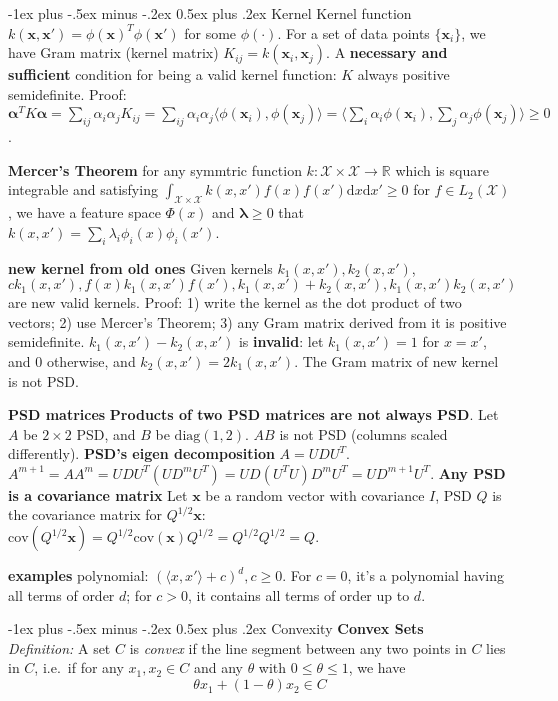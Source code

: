 \documentclass[10pt,landscape]{article}
\makeatletter
\newcommand{\vect}[1]{\boldsymbol{#1}}
\renewcommand{\section}{\@startsection{section}{1}{0mm}%
                                {-1ex plus -.5ex minus -.2ex}%
                                {0.5ex plus .2ex}%
                                {\normalfont\large\bfseries}}
\makeatother
\begin{document}
\begin{multicols}{3}
\section{Kernel}
Kernel function $k(\vect{x},\vect{x}') = \phi(\vect{x})^T \phi(\vect{x}')$ for some $\phi(\cdot)$. For a set of data points $\{\vect{x}_i\} $, we have Gram matrix (kernel matrix) $K_{ij} = k(\vect{x}_i, \vect{x}_j)$. A \textbf{necessary and sufficient} condition for being a valid kernel function: $K$ always positive semidefinite. Proof: $\vect{\alpha}^T K \vect{\alpha} = \sum_{ij} \alpha_i \alpha_j K_{ij} = \sum_{ij} \alpha_i \alpha_j \langle \phi(\vect{x}_i), \phi(\vect{x}_j) \rangle = \langle \sum_i \alpha_i \phi(\vect{x}_i),  \sum_j \alpha_j \phi(\vect{x}_j) \rangle \geq 0$.

\textbf{Mercer's Theorem} for any symmtric function $k: \mathcal{X} \times \mathcal{X} \rightarrow \mathbb{R}$ which is square integrable and satisfying $\int_{\mathcal{X} \times \mathcal{X}} k(x,x') f(x) f(x') \mathrm{d}x \mathrm{d}x' \geq 0$ for $f \in L_2(\mathcal{X})$, we have a feature space $\Phi(x)$ and $\vect{\lambda} \geq 0 $ that $k(x,x') = \sum_i \lambda_i \phi_i(x) \phi_i(x')$.

\textbf{new kernel from old ones} Given kernels $k_1(x,x'), k_2(x,x')$,  $ck_1(x,x'), f(x)k_1(x,x')f(x'), k_1(x,x')+k_2(x,x'), k_1(x,x')k_2(x,x')$ are new valid kernels. Proof: 1) write the kernel as the dot product of two vectors; 2) use Mercer's Theorem; 3) any Gram matrix derived from it is positive semidefinite. $k_1(x,x')-k_2(x,x')$ is \textbf{invalid}: let $k_1(x,x')= 1$ for $x=x'$, and $0$ otherwise, and $k_2(x,x') = 2k_1(x,x')$. The Gram matrix of new kernel is not PSD. 

\textbf{PSD matrices} \textbf{Products of two PSD matrices are not always PSD}. Let $A$ be $2\times2$ PSD, and $B$ be $\mathrm{diag}(1,2)$. $AB$ is not PSD (columns scaled differently). \textbf{PSD's eigen decomposition} $A=UDU^T$. $A^{m+1} = AA^m = UDU^T(UD^m U^T) = UD(U^T U)D^m U^T = U D^{m+1} U^T$. \textbf{Any PSD is a covariance matrix} Let $\vect{x}$ be a random vector with covariance $I$, PSD $Q$ is the covariance matrix for $Q^{1/2} \vect{x}$: $\mathrm{cov}(Q^{1/2} \vect{x}) = Q^{1/2} \mathrm{cov}(\vect{x}) Q^{1/2} = Q^{1/2}Q^{1/2} = Q$.

\textbf{examples} polynomial: $(\langle x, x' \rangle + c)^d, c\geq 0$. For $c=0$, it's a polynomial having all terms of order $d$; for $c>0$, it contains all terms of order up to $d$. 

\section{Convexity}
\textbf{Convex Sets} \\
\emph{Definition:} A set $C$ is \emph{convex} if the line segment between any two points in $C$ lies in $C$, i.e.\, if for any $x_1, x_2 \in C$ and any $\theta$ with $0 \leq \theta \leq 1$, we have \\
$$ \theta x_1 + (1 - \theta) x_2 \in C $$


\end{multicols}
\end{document}

